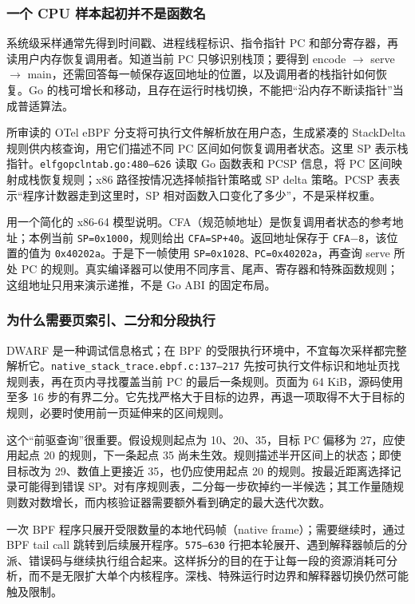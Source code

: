 \documentclass[UTF8,fontset=fandol,openany,11pt]{ctexbook}
\begin{document}
\subsubsection{一个 CPU 样本起初并不是函数名}
系统级采样通常先得到时间戳、进程线程标识、指令指针 PC 和部分寄存器，再读用户内存恢复调用者。知道当前 PC 只够识别栈顶；要得到 encode \ensuremath{\rightarrow}\allowbreak{} serve \ensuremath{\rightarrow}\allowbreak{} main，还需回答每一帧保存返回地址的位置，以及调用者的栈指针如何恢复。Go 的栈可增长和移动，且存在运行时栈切换，不能把“沿内存不断读指针”当成普适算法。

所审读的 OTel eBPF 分支将可执行文件解析放在用户态，生成紧凑的 StackDelta 规则供内核查询，用它们描述不同 PC 区间如何恢复调用者状态。这里 SP 表示栈指针。\texttt{elfgopclntab.\allowbreak{}go:\allowbreak{}480–626} 读取 Go 函数表和 PCSP 信息，将 PC 区间映射成栈恢复规则；x86 路径按情况选择帧指针策略或 SP delta 策略。PCSP 表表示“程序计数器走到这里时，SP 相对函数入口变化了多少”，不是采样权重。\cite{proj-go-unwind}

用一个简化的 x86-64 模型说明。CFA（规范帧地址）是恢复调用者状态的参考地址；本例当前 \texttt{SP=0x1000}，规则给出 \texttt{CFA=SP+40}。返回地址保存于 \texttt{CFA\ensuremath{-}8}，该位置的值为 \texttt{0x40202a}。于是下一帧使用 \texttt{SP=0x1028、PC=0x40202a}，再查询 serve 所处 PC 的规则。真实编译器可以使用不同序言、尾声、寄存器和特殊函数规则；这组地址只用来演示递推，不是 Go ABI 的固定布局。

\subsubsection{为什么需要页索引、二分和分段执行}
DWARF 是一种调试信息格式；在 BPF 的受限执行环境中，不宜每次采样都完整解析它。\texttt{native\_\allowbreak{}stack\_\allowbreak{}trace.\allowbreak{}ebpf.\allowbreak{}c:\allowbreak{}137–217} 先按可执行文件标识和地址页找规则表，再在页内寻找覆盖当前 PC 的最后一条规则。页面为 64 KiB，源码使用至多 16 步的有界二分。它先找严格大于目标的边界，再退一项取得不大于目标的规则，必要时使用前一页延伸来的区间规则。\cite{proj-ebpf-unwind}

这个“前驱查询”很重要。假设规则起点为 10、20、35，目标 PC 偏移为 27，应使用起点 20 的规则，下一条起点 35 尚未生效。规则描述半开区间上的状态；即使目标改为 29、数值上更接近 35，也仍应使用起点 20 的规则。按最近距离选择记录可能得到错误 SP。对有序规则表，二分每一步砍掉约一半候选；其工作量随规则数对数增长，而内核验证器需要额外看到确定的最大迭代次数。

一次 BPF 程序只展开受限数量的本地代码帧（native frame）；需要继续时，通过 BPF tail call 跳转到后续展开程序。\texttt{575–630} 行把本轮展开、遇到解释器帧后的分派、错误码与继续执行组合起来。这样拆分的目的在于让每一段的资源消耗可分析，而不是无限扩大单个内核程序。深栈、特殊运行时边界和解释器切换仍然可能触及限制。
\end{document}
